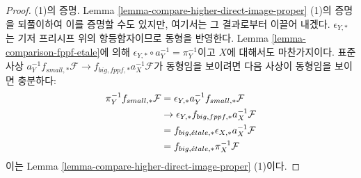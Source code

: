 \begin{proof}
(1)의 증명. Lemma \ref{lemma-compare-higher-direct-image-proper} (1)의
증명을 되풀이하여 이를 증명할 수도 있지만, 여기서는 그 결과로부터
이끌어 내겠다. $\epsilon_{Y, *}$는 기저 프리시프 위의 항등함자이므로
동형을 반영한다. Lemma \ref{lemma-comparison-fppf-etale}에 의해
$\epsilon_{Y, *} \circ a_Y^{-1} = \pi_Y^{-1}$이고 $X$에 대해서도
마찬가지이다. 표준사상
$a_Y^{-1}f_{small, *}\mathcal{F} \to f_{big, fppf, *}a_X^{-1}\mathcal{F}$가
동형임을 보이려면 다음 사상이 동형임을 보이면 충분하다:
\begin{align*}
\pi_Y^{-1}f_{small, *}\mathcal{F}
& =
\epsilon_{Y, *}a_Y^{-1}f_{small, *}\mathcal{F} \\
& \to 
\epsilon_{Y, *}f_{big, fppf, *}a_X^{-1}\mathcal{F} \\
& =
f_{big, {\acute{e}tale}, *} \epsilon_{X, *}a_X^{-1}\mathcal{F} \\
& =
f_{big, {\acute{e}tale}, *}\pi_X^{-1}\mathcal{F}
\end{align*}
이는 Lemma \ref{lemma-compare-higher-direct-image-proper} (1)이다.


\end{proof}
